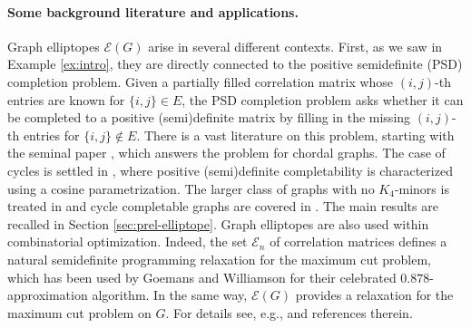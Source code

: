 \documentclass[a4paper, 11pt, twoside]{article}
\newcommand{\ME}{{\mathcal E}}
\theoremstyle{plain}
\begin{document}
\paragraph{Some background literature and applications.} Graph elliptopes $\ME(G)$ arise in several different contexts. First, as we saw in Example \ref{ex:intro}, they are directly connected to the {positive semidefinite (PSD) completion problem}. Given a partially filled correlation matrix whose   $(i,j)$-th entries  are known for $\{i,j\} \in E$, the PSD completion problem asks whether it can be completed to a positive (semi)definite matrix by filling in the missing $(i,j)$-th entries for $\{i,j\} \notin E$. There is a vast literature on this problem, starting with the seminal paper \cite{GJSW_1984}, which  answers the problem for chordal graphs. The case of cycles is settled in \cite{Barrett1993realpositivedefinite}, where positive (semi)definite completability is characterized using a cosine parametrization. The larger class  of graphs with no $K_4$-minors is treated in \cite{Laurent1997realpositivesemidefinite} and cycle completable graphs are covered in \cite{BJL-cycle-completability}. 
The main results are recalled in Section \ref{sec:prel-elliptope}.
Graph elliptopes are also used  within combinatorial optimization. Indeed, the set $\ME_n$ of correlation matrices defines a natural semidefinite programming relaxation for the maximum cut problem, which has been used by Goemans and Williamson \cite{GW_1995} for their celebrated $0.878$-approximation algorithm. In the same way, $\ME(G)$ provides a relaxation for the maximum cut problem on $G$. For  details see, e.g.,  \cite{Laurent_1997,Laurent-Poljak_1995} and references therein. 
\end{document}
